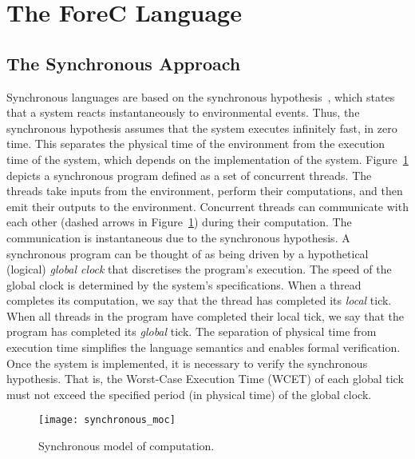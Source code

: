 \section{The ForeC Language}
\label{sec:forecLanguage}


\subsection{The Synchronous Approach}
Synchronous languages are based on the synchronous hypothesis~\cite{timed_synchronous_survey},
which states that a system reacts instantaneously to environmental
events. Thus, the synchronous hypothesis assumes that the system 
executes infinitely fast, in zero time. This separates the physical 
time of the environment from the execution time of the system, 
which depends on the implementation of the system.
Figure~\ref{fig:synchronous_moc} depicts a synchronous 
program defined as a set of concurrent threads. The threads 
take inputs from the environment, perform their computations,
and then emit their outputs to the environment. 
Concurrent threads can communicate with each other (dashed 
arrows in Figure~\ref{fig:synchronous_moc}) during their
computation. The communication is instantaneous due to 
the synchronous hypothesis. A synchronous program 
can be thought of as being driven by a hypothetical (logical) \emph{global clock}
that discretises the program's execution. The speed 
of the global clock is determined by the system's specifications. 
When a thread completes its computation, we say that the thread 
has completed its \emph{local} tick. When all threads in the 
program have completed their local tick, we say that the program
has completed its \emph{global} tick. 
The separation of physical time from execution time simplifies 
the language semantics and enables formal verification. Once the 
system is implemented, it is necessary to verify the synchronous 
hypothesis. That is, the Worst-Case Execution Time (WCET) of each 
global tick must not exceed the specified period (in physical time) 
of the global clock.

\begin{figure}
	\centering
	
	\texttt{[image: synchronous\_moc]}	
	\caption{Synchronous model of computation.}
	\label{fig:synchronous_moc}
\end{figure}

